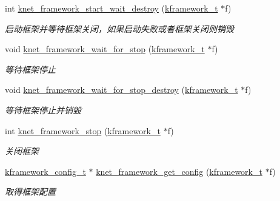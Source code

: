\begin{DoxyCompactItemize}
int \hyperlink{a00106_gab44f183a42eda626fe6ec1e6d35bb859_gab44f183a42eda626fe6ec1e6d35bb859}{knet\+\_\+framework\+\_\+start\+\_\+wait\+\_\+destroy} (\hyperlink{a00053_a3195a3be35782fc1efb920c811be111d_a3195a3be35782fc1efb920c811be111d}{kframework\+\_\+t} $\ast$f)
\begin{DoxyCompactList}\small\item\em 启动框架并等待框架关闭，如果启动失败或者框架关闭则销毁 \end{DoxyCompactList}\item 
void \hyperlink{a00106_gacff434cca9ce60fa5a3597348ee4360b_gacff434cca9ce60fa5a3597348ee4360b}{knet\+\_\+framework\+\_\+wait\+\_\+for\+\_\+stop} (\hyperlink{a00053_a3195a3be35782fc1efb920c811be111d_a3195a3be35782fc1efb920c811be111d}{kframework\+\_\+t} $\ast$f)
\begin{DoxyCompactList}\small\item\em 等待框架停止 \end{DoxyCompactList}\item 
void \hyperlink{a00106_ga5936d2ece03511c366b19bc7616ac8be_ga5936d2ece03511c366b19bc7616ac8be}{knet\+\_\+framework\+\_\+wait\+\_\+for\+\_\+stop\+\_\+destroy} (\hyperlink{a00053_a3195a3be35782fc1efb920c811be111d_a3195a3be35782fc1efb920c811be111d}{kframework\+\_\+t} $\ast$f)
\begin{DoxyCompactList}\small\item\em 等待框架停止并销毁 \end{DoxyCompactList}\item 
int \hyperlink{a00106_gac8f76fe72392bc5103b70fb5b3280839_gac8f76fe72392bc5103b70fb5b3280839}{knet\+\_\+framework\+\_\+stop} (\hyperlink{a00053_a3195a3be35782fc1efb920c811be111d_a3195a3be35782fc1efb920c811be111d}{kframework\+\_\+t} $\ast$f)
\begin{DoxyCompactList}\small\item\em 关闭框架 \end{DoxyCompactList}\item 
\hyperlink{a00053_adeaf952e0f0887507ff836385bf54874_adeaf952e0f0887507ff836385bf54874}{kframework\+\_\+config\+\_\+t} $\ast$ \hyperlink{a00106_ga2fcd8c172557a78fe7edbba0e7f9da40_ga2fcd8c172557a78fe7edbba0e7f9da40}{knet\+\_\+framework\+\_\+get\+\_\+config} (\hyperlink{a00053_a3195a3be35782fc1efb920c811be111d_a3195a3be35782fc1efb920c811be111d}{kframework\+\_\+t} $\ast$f)
\begin{DoxyCompactList}\small\item\em 取得框架配置 \end{DoxyCompactList}\item 

\end{DoxyCompactItemize}
